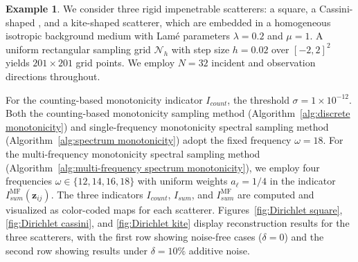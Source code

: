 \documentclass[11pt,reqno,twoside]{amsart}
\theoremstyle{definition}
\newtheorem{example}{Example}[section]
\theoremstyle{remark}
\numberwithin{equation}{section}
\begin{document}
\begin{example}\label{ex:Dirichlet spectrum}
We consider three rigid impenetrable scatterers: a square, a Cassini-shaped , and a kite-shaped scatterer, which are embedded in a homogeneous isotropic background medium with Lam\'{e} parameters $\lambda = 0.2$ and $\mu = 1$. A uniform rectangular sampling grid $\mathcal{N}_h$ with step size $h = 0.02$ over $[-2,2]^2$ yields $201 \times 201$ grid points. We employ $N = 32$ incident and observation directions throughout.

For the counting-based monotonicity indicator \(I_{count}\), the threshold $\sigma = 1 \times 10^{-12}$. Both the counting-based monotonicity sampling method (Algorithm~\ref{alg:discrete monotonicity}) and single-frequency monotonicity spectral sampling method (Algorithm~\ref{alg:spectrum monotonicity}) adopt the fixed frequency $\omega = 18$. For the multi-frequency monotonicity spectral sampling method (Algorithm~\ref{alg:multi-frequency spectrum monotonicity}), we employ four frequencies $\omega \in \{12, 14, 16, 18\}$ with uniform weights $a_\ell = 1/4$ in the indicator $I_{sum}^{\mathrm{MF}}(\mathbf{z}_{ij})$.
The three indicators $I_{count}$, $I_{sum}$, and $I_{sum}^{\mathrm{MF}}$ are computed and visualized as color-coded maps for each scatterer. Figures~\ref{fig:Dirichlet square}, \ref{fig:Dirichlet cassini}, and \ref{fig:Dirichlet kite} display reconstruction results for the three scatterers, with the first row showing noise-free cases ($\delta = 0$) and the second row showing results under $\delta = 10\%$ additive noise.


\end{example}
\end{document}
